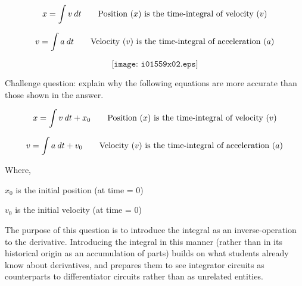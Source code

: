





$$x = \int v \> dt \hbox{\hskip 20pt Position (}x \hbox{) is the time-integral of velocity (}v \hbox{)}$$

$$v = \int a \> dt \hbox{\hskip 20pt Velocity (}v \hbox{) is the time-integral of acceleration (}a \hbox{)}$$

$$\texttt{[image: i01559x02.eps]}$$

\vskip 10pt

Challenge question: explain why the following equations are more accurate than those shown in the answer.

$$x = \int v \> dt + x_0 \hbox{\hskip 20pt Position (}x \hbox{) is the time-integral of velocity (}v \hbox{)}$$

$$v = \int a \> dt + v_0 \hbox{\hskip 20pt Velocity (}v \hbox{) is the time-integral of acceleration (}a \hbox{)}$$

\noindent
Where,

$x_0$ is the initial position (at time = 0)

$v_0$ is the initial velocity (at time = 0)







The purpose of this question is to introduce the integral as an inverse-operation to the derivative.  Introducing the integral in this manner (rather than in its historical origin as an accumulation of parts) builds on what students already know about derivatives, and prepares them to see integrator circuits as counterparts to differentiator circuits rather than as unrelated entities.




